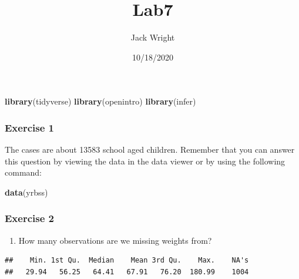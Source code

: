 \documentclass[
]{article}
\title{Lab7}
\author{Jack Wright}
\date{10/18/2020}
\newenvironment{Shaded}{\begin{snugshade}}{\end{snugshade}}
\newcommand{\KeywordTok}[1]{\textcolor[rgb]{0.13,0.29,0.53}{\textbf{#1}}}
\newcommand{\NormalTok}[1]{#1}
\newcommand{\OperatorTok}[1]{\textcolor[rgb]{0.81,0.36,0.00}{\textbf{#1}}}
\newcommand{\StringTok}[1]{\textcolor[rgb]{0.31,0.60,0.02}{#1}}
\providecommand{\tightlist}{%
  \setlength{\itemsep}{0pt}\setlength{\parskip}{0pt}}
\begin{document}
\maketitle

\begin{Shaded}
\begin{Highlighting}[]
\KeywordTok{library}\NormalTok{(tidyverse)}
\KeywordTok{library}\NormalTok{(openintro)}
\KeywordTok{library}\NormalTok{(infer)}
\end{Highlighting}
\end{Shaded}

\hypertarget{exercise-1}{%
\subsubsection{Exercise 1}\label{exercise-1}}

The cases are about 13583 school aged children. Remember that you can
answer this question by viewing the data in the data viewer or by using
the following command:

\begin{Shaded}
\begin{Highlighting}[]
\KeywordTok{data}\NormalTok{(yrbss)}
\end{Highlighting}
\end{Shaded}

\hypertarget{exercise-2}{%
\subsubsection{Exercise 2}\label{exercise-2}}

\begin{enumerate}
\def\labelenumi{\arabic{enumi}.}
\tightlist
\item
  How many observations are we missing weights from?
\end{enumerate}

\begin{Shaded}
\end{Shaded}

\begin{verbatim}
##    Min. 1st Qu.  Median    Mean 3rd Qu.    Max.    NA's 
##   29.94   56.25   64.41   67.91   76.20  180.99    1004
\end{verbatim}

\begin{Shaded}
\end{Shaded}
\end{document}
